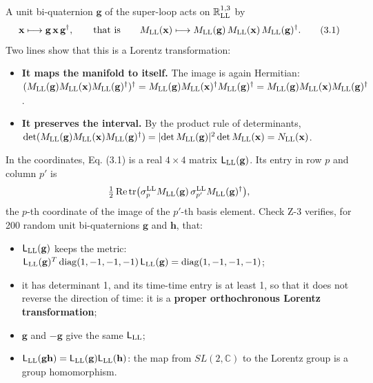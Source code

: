 \documentclass[
  10pt,
]{article}
\providecommand{\tightlist}{%
  \setlength{\itemsep}{0pt}\setlength{\parskip}{0pt}}
\begin{document}
A unit bi-quaternion \(\mathbf g\) of the super-loop acts on
\(\mathbb R^{1,3}_{\rm LL}\) by
\[\mathbf x\longmapsto\mathbf g\,\mathbf x\,\mathbf g^\dagger,\qquad\text{that is}\qquad M_{\rm LL}(\mathbf x)\longmapsto M_{\rm LL}(\mathbf g)\,M_{\rm LL}(\mathbf x)\,M_{\rm LL}(\mathbf g)^\dagger. \tag{3.1}\]
Two lines show that this is a Lorentz transformation:

\begin{itemize}
\tightlist
\item
  \textbf{It maps the manifold to itself.} The image is again Hermitian:
  \((M_{\rm LL}(\mathbf g)M_{\rm LL}(\mathbf x)M_{\rm LL}(\mathbf g)^\dagger)^\dagger=M_{\rm LL}(\mathbf g)M_{\rm LL}(\mathbf x)^\dagger M_{\rm LL}(\mathbf g)^\dagger=M_{\rm LL}(\mathbf g)M_{\rm LL}(\mathbf x)M_{\rm LL}(\mathbf g)^\dagger\).
\item
  \textbf{It preserves the interval.} By the product rule of
  determinants,
  \(\det(M_{\rm LL}(\mathbf g)M_{\rm LL}(\mathbf x)M_{\rm LL}(\mathbf g)^\dagger)=\lvert\det M_{\rm LL}(\mathbf g)\rvert^2\det M_{\rm LL}(\mathbf x)=N_{\rm LL}(\mathbf x)\).
\end{itemize}

In the coordinates, Eq. (3.1) is a real \(4\times4\) matrix
\(\mathsf L_{\rm LL}(\mathbf g)\). Its entry in row \(p\) and column
\(p'\) is
\[\tfrac12\,\mathrm{Re}\,\mathrm{tr}\big(\sigma^{\rm LL}_pM_{\rm LL}(\mathbf g)\,\sigma^{\rm LL}_{p'}M_{\rm LL}(\mathbf g)^\dagger\big),\]
the \(p\)-th coordinate of the image of the \(p'\)-th basis element.
Check Z-3 verifies, for 200 random unit bi-quaternions \(\mathbf g\) and
\(\mathbf h\), that:

\begin{itemize}
\tightlist
\item
  \(\mathsf L_{\rm LL}(\mathbf g)\) keeps the metric:
  \(\mathsf L_{\rm LL}(\mathbf g)^T\,\mathrm{diag}(1,-1,-1,-1)\,\mathsf L_{\rm LL}(\mathbf g)=\mathrm{diag}(1,-1,-1,-1)\);
\item
  it has determinant 1, and its time-time entry is at least 1, so that
  it does not reverse the direction of time: it is a \textbf{proper
  orthochronous Lorentz transformation};
\item
  \(\mathbf g\) and \(-\mathbf g\) give the same \(\mathsf L_{\rm LL}\);
\item
  \(\mathsf L_{\rm LL}(\mathbf g\mathbf h)=\mathsf L_{\rm LL}(\mathbf g)\mathsf L_{\rm LL}(\mathbf h)\):
  the map from \(SL(2,\mathbb C)\) to the Lorentz group is a group
  homomorphism.
\end{itemize}
\end{document}
